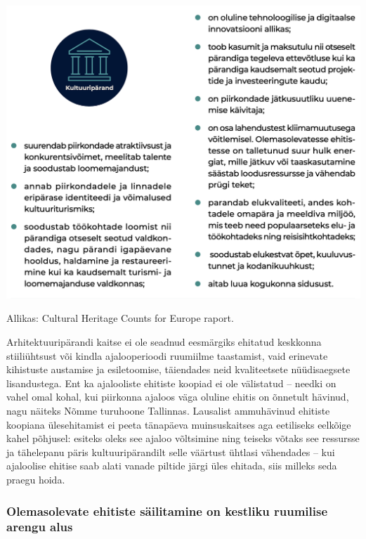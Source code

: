 \documentclass[estonian,]{article}
\begin{document}
\begin{center}\includegraphics[width=0.9\linewidth]{figures/2-chapter/fig222} \end{center}
\begin{imgsource}
{Allikas:} Cultural Heritage Counts for Europe raport.
\end{imgsource}

Arhitektuuripärandi kaitse ei ole seadnud eesmärgiks ehitatud keskkonna stiiliühtsust või kindla ajalooperioodi ruumiilme taastamist, vaid erinevate kihistuste austamise ja esiletoomise, täiendades neid kvaliteetsete nüüdisaegsete lisandustega. Ent ka ajalooliste ehitiste koopiad ei ole välistatud -- needki on vahel omal kohal, kui piirkonna ajaloos väga oluline ehitis on õnnetult hävinud, nagu näiteks Nõmme turuhoone Tallinnas. Lausalist ammuhävinud ehitiste koopiana ülesehitamist ei peeta tänapäeva muinsuskaitses aga eetiliseks eelkõige kahel põhjusel: esiteks oleks see ajaloo võltsimine ning teiseks võtaks see ressursse ja tähelepanu päris kultuuripärandilt selle väärtust ühtlasi vähendades -- kui ajaloolise ehitise saab alati vanade piltide järgi üles ehitada, siis milleks seda praegu hoida.

\hypertarget{olemasolevate-ehitiste-suxe4ilitamine-on-kestliku-ruumilise-arengu-alus}{%
\subsubsection*{Olemasolevate ehitiste säilitamine on kestliku ruumilise arengu alus}\label{olemasolevate-ehitiste-suxe4ilitamine-on-kestliku-ruumilise-arengu-alus}}
\end{document}
